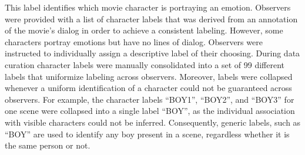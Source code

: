 This label identifies which movie character is portraying an emotion. Observers
were provided with a list of character labels that was derived from an
annotation of the movie's dialog in order to achieve a consistent labeling.
However, some characters portray emotions but have no lines of dialog.
Observers were instructed to individually assign a descriptive label of their
choosing. During data curation character labels were manually consolidated
into a set of 99 different labels that uniformize labeling across observers.
Moreover, labels were collapsed whenever a uniform identification of a
character could not be guaranteed across observers. For example, the character
labels ``BOY1'', ``BOY2'', and ``BOY3'' for one scene were collapsed into a
single label ``BOY'', as the individual association with visible characters
could not be inferred. Consequently, generic labels, such as ``BOY'' are used
to identify any boy present in a scene, regardless whether it is the same
person or not.


